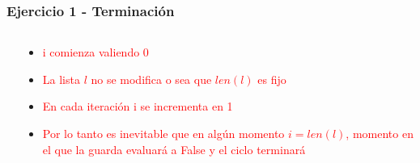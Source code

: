 \newcommand{\docente}{Cristian Nahuel Díaz}
\newcommand{\code}[1]{\texttt{#1}}




\usepackage{color}










\begin{frame}
\titlepage
\end{frame}



\begin{frame}[fragile]\frametitle{Ejercicio 1 - Terminaci\'on}
\begin{columns}
\begin{column}{0.35\textwidth}

\end{column}
\begin{column}{0.65\textwidth}
\begin{itemize}[<+->]
  \item \textcolor<1>{red}{i comienza valiendo 0}
  \item \textcolor<2>{red}{La lista $l$ no se modifica o sea que $len(l)$ es fijo}
  \item \textcolor<3>{red}{En cada iteraci\'on i se incrementa en 1}
  \item \textcolor<4>{red}{Por lo tanto es inevitable que en alg\'un momento $i = len(l)$, momento en el que la guarda evaluar\'a a False y el ciclo terminar\'a}
\end{itemize}
\end{column}
\end{columns}
\end{frame}


